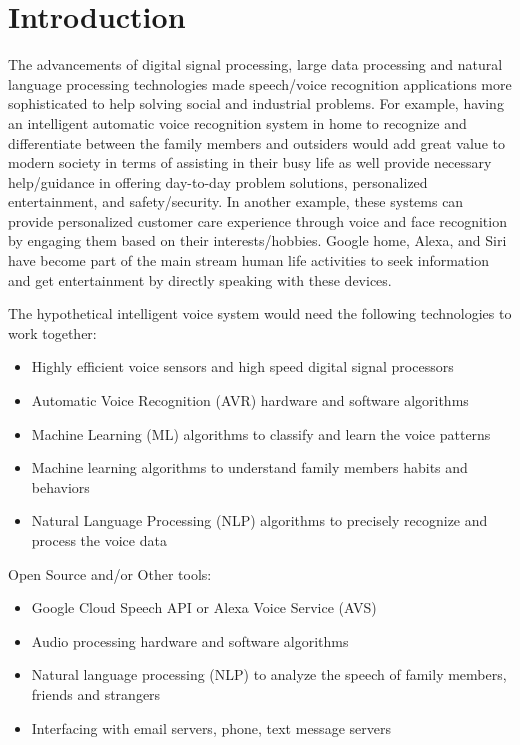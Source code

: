 \documentclass[sigconf]{acmart}
\begin{document}
\section{Introduction}
The advancements of digital signal processing, large data processing and natural language processing technologies made speech/voice recognition applications more sophisticated to help solving social and industrial problems. For example, having an intelligent automatic voice recognition system in home to recognize and differentiate between the family members and outsiders would add great value to modern society in terms of assisting in their busy life as well provide necessary help/guidance in offering day-to-day problem solutions, personalized entertainment,  and safety/security. In another example, these systems can provide personalized customer care experience through voice and face recognition by engaging them based on their interests/hobbies. Google home, Alexa, and Siri have become part of the main stream human life activities to seek information and get entertainment by directly speaking with these devices.
\par\null\par
The hypothetical intelligent voice system would need the following technologies to work together:
 \begin{itemize}
     \item Highly efficient voice sensors and high speed digital signal processors
     \item Automatic Voice Recognition (AVR) hardware and software algorithms
     \item Machine Learning (ML) algorithms to classify and learn the voice patterns
     \item Machine learning algorithms to understand family members habits and behaviors
     \item Natural Language Processing (NLP) algorithms to precisely recognize and process the voice data
 \end{itemize}
\par\null\par
 Open Source and/or Other tools:
 \begin{itemize}
     \item Google Cloud Speech API or Alexa Voice Service (AVS)
     \item Audio processing hardware and software algorithms
     \item Natural language processing (NLP) to analyze the speech of family members, friends and strangers
     \item Interfacing with email servers, phone, text message servers
 \end{itemize}
\par\null\par
\end{document}
